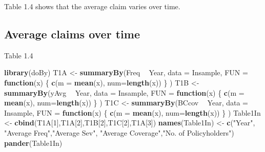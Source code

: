 \documentclass[]{book}
\newenvironment{Shaded}{\begin{snugshade}}{\end{snugshade}}
\newcommand{\KeywordTok}[1]{\textcolor[rgb]{0.13,0.29,0.53}{\textbf{#1}}}
\newcommand{\DataTypeTok}[1]{\textcolor[rgb]{0.13,0.29,0.53}{#1}}
\newcommand{\DecValTok}[1]{\textcolor[rgb]{0.00,0.00,0.81}{#1}}
\newcommand{\StringTok}[1]{\textcolor[rgb]{0.31,0.60,0.02}{#1}}
\newcommand{\ControlFlowTok}[1]{\textcolor[rgb]{0.13,0.29,0.53}{\textbf{#1}}}
\newcommand{\OperatorTok}[1]{\textcolor[rgb]{0.81,0.36,0.00}{\textbf{#1}}}
\newcommand{\NormalTok}[1]{#1}
\theoremstyle{definition}
\theoremstyle{definition}
\theoremstyle{definition}
\theoremstyle{remark}
\begin{document}
Table 1.4 shows that the average claim varies over time.

\subsection{Average claims over time}\label{average-claims-over-time}

Table 1.4

\begin{Shaded}
\begin{Highlighting}[]
\KeywordTok{library}\NormalTok{(doBy)}
\NormalTok{T1A <-}\StringTok{ }\KeywordTok{summaryBy}\NormalTok{(Freq }\OperatorTok{~}\StringTok{ }\NormalTok{Year, }\DataTypeTok{data =}\NormalTok{ Insample,   }
                 \DataTypeTok{FUN =} \ControlFlowTok{function}\NormalTok{(x) \{ }\KeywordTok{c}\NormalTok{(}\DataTypeTok{m =} \KeywordTok{mean}\NormalTok{(x), }\DataTypeTok{num=}\KeywordTok{length}\NormalTok{(x)) \} )}
\NormalTok{T1B <-}\StringTok{ }\KeywordTok{summaryBy}\NormalTok{(yAvg    }\OperatorTok{~}\StringTok{ }\NormalTok{Year, }\DataTypeTok{data =}\NormalTok{ Insample,   }
                 \DataTypeTok{FUN =} \ControlFlowTok{function}\NormalTok{(x) \{ }\KeywordTok{c}\NormalTok{(}\DataTypeTok{m =} \KeywordTok{mean}\NormalTok{(x), }\DataTypeTok{num=}\KeywordTok{length}\NormalTok{(x)) \} )}
\NormalTok{T1C <-}\StringTok{ }\KeywordTok{summaryBy}\NormalTok{(BCcov    }\OperatorTok{~}\StringTok{ }\NormalTok{Year, }\DataTypeTok{data =}\NormalTok{ Insample,   }
                 \DataTypeTok{FUN =} \ControlFlowTok{function}\NormalTok{(x) \{ }\KeywordTok{c}\NormalTok{(}\DataTypeTok{m =} \KeywordTok{mean}\NormalTok{(x), }\DataTypeTok{num=}\KeywordTok{length}\NormalTok{(x)) \} )}
\NormalTok{Table1In <-}\StringTok{ }\KeywordTok{cbind}\NormalTok{(T1A[}\DecValTok{1}\NormalTok{],T1A[}\DecValTok{2}\NormalTok{],T1B[}\DecValTok{2}\NormalTok{],T1C[}\DecValTok{2}\NormalTok{],T1A[}\DecValTok{3}\NormalTok{])}
\KeywordTok{names}\NormalTok{(Table1In) <-}\StringTok{ }\KeywordTok{c}\NormalTok{(}\StringTok{"Year"}\NormalTok{, }\StringTok{"Average Freq"}\NormalTok{,}\StringTok{"Average Sev"}\NormalTok{, }\StringTok{"Average Coverage"}\NormalTok{,}\StringTok{"No. of Policyholders"}\NormalTok{)}
\KeywordTok{pander}\NormalTok{(Table1In)}
\end{Highlighting}
\end{Shaded}
\end{document}
